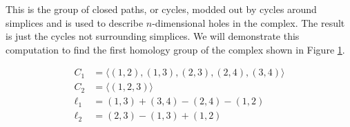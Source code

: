 This is the group of closed paths, or cycles, modded out by cycles around simplices and is used to describe \(n\)-dimensional holes in the complex.
The result is just the cycles not surrounding simplices.
We will demonstrate this computation to find the first homology group of the complex shown in Figure \ref{fig:example-cech}.

\begin{example}

    \begin{figure}
        \centering
        \begin{minipage}{.5\textwidth}
            \centering
            
        \end{minipage}%
        \begin{minipage}{.5\textwidth}
            \begin{align*}
                C_1 &= \langle (1,2),(1,3),(2,3),(2,4),(3,4) \rangle \\
                C_2 &= \langle (1,2,3) \rangle \\
                \ell_1 &= (1,3) + (3,4) - (2,4) - (1,2)\\
                \ell_2 &= (2,3) - (1,3) + (1,2)
            \end{align*}
        \end{minipage}
        \caption{}
        \label{fig:example-cech}
    \end{figure}


\end{example}
